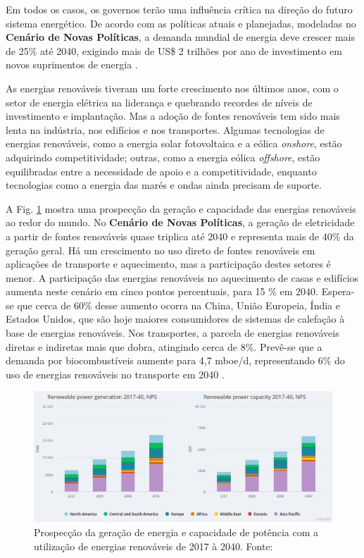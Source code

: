 Em todos os casos, os governos terão uma influência crítica na direção do futuro sistema energético. 
De acordo com as políticas atuais e planejadas, modeladas no \textbf{Cenário de Novas Políticas}, a demanda mundial de energia deve crescer mais de 25\% até 2040, exigindo mais de US\$ 2 trilhões por ano de investimento em novos suprimentos de energia \cite{WEO2018}.

As energias renováveis tiveram um forte crescimento nos últimos anos, com o setor de energia elétrica na liderança e quebrando recordes de níveis de investimento e implantação.
Mas a adoção de fontes renováveis tem sido mais lenta na indústria, nos edifícios e nos transportes.
Algumas tecnologias de energias renováveis, como a energia solar fotovoltaica e a eólica \textit{onshore}, estão adquirindo competitividade; outras, como a energia eólica \textit{offshore}, estão equilibradas entre a necessidade de apoio e a competitividade, enquanto tecnologias como a energia das marés e ondas ainda precisam de suporte.

A Fig. \ref{fig:geracao-capacidade-energias-renovaveis} mostra uma prospecção da geração e capacidade das energias renováveis ao redor do mundo. 
No \textbf{Cenário de Novas Políticas}, a geração de eletricidade a partir de fontes renováveis quase triplica até 2040 e representa mais de 40\% da geração geral.
Há um crescimento no uso direto de fontes renováveis em aplicações de transporte e aquecimento, mas a participação destes setores é menor.
A participação das energias renováveis no aquecimento de casas e edifícios aumenta neste cenário em cinco pontos percentuais, para 15 \% em 2040.
Espera-se que cerca de 60\% desse aumento ocorra na China, União Europeia, Índia e Estados Unidos, que são hoje maiores consumidores de sistemas de calefação à base de energias renováveis.
Nos transportes, a parcela de energias renováveis diretas e indiretas mais que dobra, atingindo cerca de 8\%. 
Prevê-se que a demanda por biocombustíveis aumente para 4,7 mboe/d, representando 6\% do uso de energias renováveis no transporte em 2040 \cite{WEO2018}.

\begin{figure}[!hbt]
	\begin{center}
    \includegraphics[width=\textwidth]{figuras/geracao_capacidade_potencia_energias_renovaveis.png}
    \caption{Prospecção da geração de energia e capacidade de potência com a utilização de energias renováveis de 2017 à 2040. Fonte: \cite{WEO2018}}
    \label{fig:geracao-capacidade-energias-renovaveis}
    \end{center}
\end{figure}

